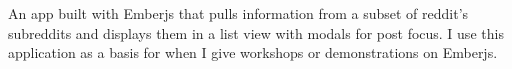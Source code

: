 

{An app built with Emberjs that pulls information from a subset of reddit's subreddits and displays them in a list view with modals for post focus. I use this application as a basis for when I give workshops or demonstrations on Emberjs.}